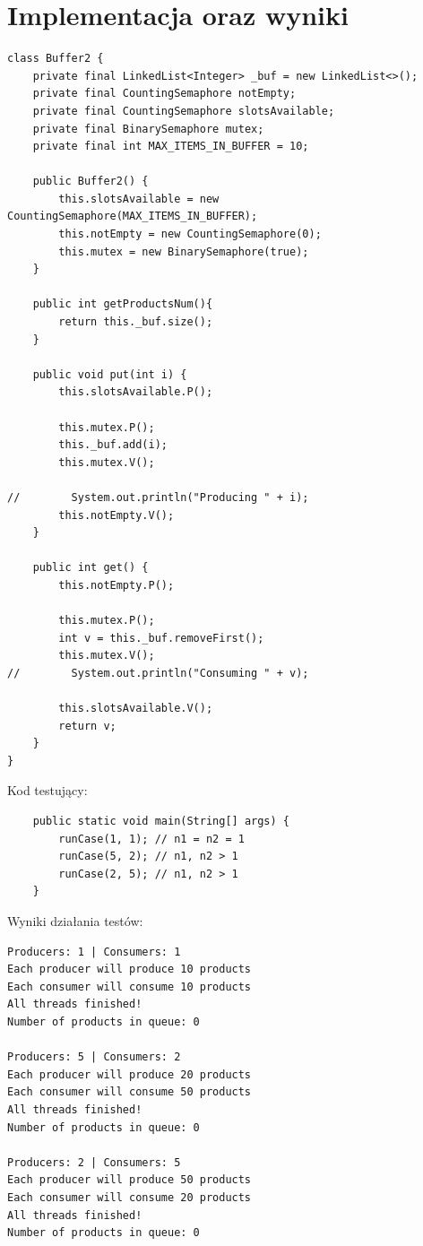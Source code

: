 \documentclass[12pt]{article}
\begin{document}
\section{Implementacja oraz wyniki}
\begin{verbatim}
class Buffer2 {
    private final LinkedList<Integer> _buf = new LinkedList<>();
    private final CountingSemaphore notEmpty;
    private final CountingSemaphore slotsAvailable;
    private final BinarySemaphore mutex;
    private final int MAX_ITEMS_IN_BUFFER = 10;

    public Buffer2() {
        this.slotsAvailable = new CountingSemaphore(MAX_ITEMS_IN_BUFFER);
        this.notEmpty = new CountingSemaphore(0);
        this.mutex = new BinarySemaphore(true);
    }

    public int getProductsNum(){
        return this._buf.size();
    }

    public void put(int i) {
        this.slotsAvailable.P();

        this.mutex.P();
        this._buf.add(i);
        this.mutex.V();

//        System.out.println("Producing " + i);
        this.notEmpty.V();
    }

    public int get() {
        this.notEmpty.P();

        this.mutex.P();
        int v = this._buf.removeFirst();
        this.mutex.V();
//        System.out.println("Consuming " + v);

        this.slotsAvailable.V();
        return v;
    }
}
\end{verbatim}
\vspace{0.5cm}
Kod testujący:
\begin{verbatim}
    public static void main(String[] args) {
        runCase(1, 1); // n1 = n2 = 1
        runCase(5, 2); // n1, n2 > 1
        runCase(2, 5); // n1, n2 > 1
    }
\end{verbatim}
\vspace{0.5cm}
Wyniki działania testów:
\begin{verbatim}
Producers: 1 | Consumers: 1
Each producer will produce 10 products
Each consumer will consume 10 products
All threads finished!
Number of products in queue: 0

Producers: 5 | Consumers: 2
Each producer will produce 20 products
Each consumer will consume 50 products
All threads finished!
Number of products in queue: 0

Producers: 2 | Consumers: 5
Each producer will produce 50 products
Each consumer will consume 20 products
All threads finished!
Number of products in queue: 0
\end{verbatim}
\end{document}
